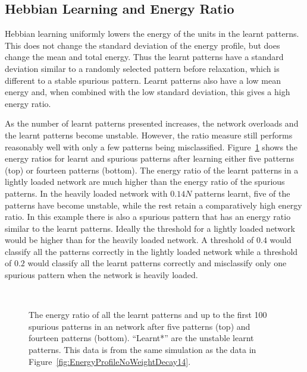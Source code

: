 \subsection{Hebbian Learning and Energy Ratio}
Hebbian learning uniformly lowers the energy of the units in the learnt patterns. This does not change the standard deviation of the energy profile, but does change the mean and total energy.  Thus the learnt patterns have a standard deviation similar to a randomly selected pattern before relaxation, which is different to a stable spurious pattern.  Learnt patterns also have a low mean energy and, when combined with the low standard deviation, this gives a high energy ratio.

As the number of learnt patterns presented increases, the network overloads and the learnt patterns become unstable.  However, the ratio measure still performs reasonably well with only a few patterns being misclassified. Figure~\ref{fig:HebbEROverload} shows the energy ratios for learnt and spurious patterns after learning either five patterns (top) or fourteen patterns (bottom).  The energy ratio of the learnt patterns in a lightly loaded network are much higher than the energy ratio of the spurious patterns.  In the heavily loaded network with $0.14N$ patterns learnt, five of the patterns have become unstable, while the rest retain a comparatively high energy ratio.  In this example there is also a spurious pattern that has an energy ratio similar to the learnt patterns.  Ideally the threshold for a lightly loaded network would be higher than for the heavily loaded network.  A threshold of $0.4$ would classify all the patterns correctly in the lightly loaded network while a threshold of $0.2$  would classify all the learnt patterns correctly and misclassify only one spurious pattern when the network is heavily loaded.

\begin{figure}
\center
\small
	
	\vspace{1cm}\\
	
	\caption{The energy ratio of all the learnt patterns and up to the first 100 spurious patterns in an  network after five patterns (top) and fourteen patterns (bottom). ``Learnt*'' are the unstable learnt patterns. This data is from the same simulation as the data in Figure~\ref{fig:EnergyProfileNoWeightDecay14}.}
	\label{fig:HebbEROverload}
\end{figure}

